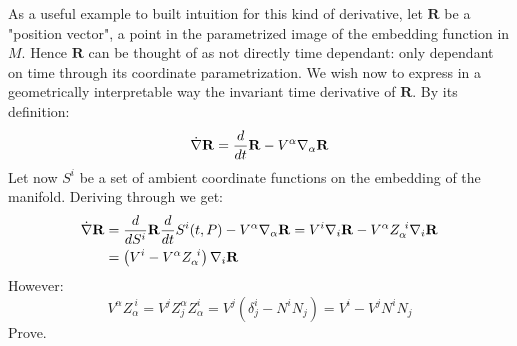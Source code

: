 \documentclass[../main.tex]{subfiles}
\begin{document}
        As a useful example to built intuition for this kind of derivative, let $\mathbf{R}$ be a "position vector", a point in the parametrized image of the embedding function in $M$. Hence $\mathbf{R}$ can be thought of as not directly time dependant: only dependant on time through its coordinate parametrization. We wish now to express in a geometrically interpretable way the invariant time derivative of $\mathbf{R}$.
        By its definition:
        \begin{equation}
          \dot{\nabla}\mathbf{R}=\dfrac{d}{dt}\mathbf{R}-V^\alpha\nabla_\alpha\mathbf{R}
        \end{equation}
        Let now $S^i$ be a set of ambient coordinate functions on the embedding of the manifold. Deriving through we get:
        \begin{align}
          \dot{\nabla}\mathbf{R}&=\der{}{S^{i}}\mathbf{R}\der{}{t}S^{i}(t,P)-V^{\alpha}\nabla_{\alpha}\mathbf{R}=V^{i}\nabla_{i}\mathbf{R}-V^{\alpha} Z_{\alpha}^{\ i}\nabla_{i}\mathbf{R} \\
          &=\left(V^{i}-V^{\alpha} Z_{\alpha}^{\ i}\right)\nabla_{i}\mathbf{R}
        \end{align}
        However:
        \begin{equation}
            V^\alpha Z_\alpha^{\ i}= V^jZ^\alpha_jZ^i_\alpha=V^j\left(\delta_j^i-N^iN_j\right)=V^i-V^jN^iN_j
        \end{equation}
        Prove.
        
\end{document}
